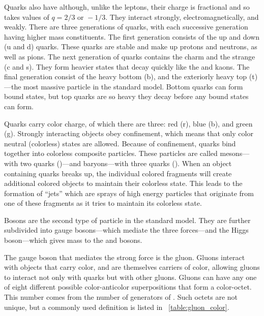 Quarks also have \spinhalf although, unlike the leptons, their charge is
fractional and so takes values of $q = 2/3 \text{ or } -1/3$. They interact
strongly, electromagnetically, and weakly. There are three generations of
quarks, with each successive generation having higher mass constituents. The
first generation consists of the up and down (u and d) quarks. These quarks are
stable and make up protons and neutrons, as well as pions. The next generation
of quarks contains the charm and the strange (c and s). They form heavier
states that decay quickly like the \jpsi and kaons. The final generation
consist of the heavy bottom (b), and the exteriorly heavy top (t)---the most
massive particle in the standard model. Bottom quarks can form bound states,
but top quarks are so heavy they decay before any bound states can form.

Quarks carry color charge, of which there are three: red (r),
blue (b), and green (g). Strongly interacting objects obey confinement, which
means that only color neutral (colorless) states are allowed. Because of
confinement, quarks bind together into colorless composite particles. These
particles are called mesons---with two quarks (\qqbar)---and baryons---with
three quarks (\baryon). When an object containing quarks breaks up, the
individual colored fragments will create additional colored objects to maintain
their colorless state. This leads to the formation of ``jets'' which are sprays
of high energy particles that originate from one of these fragments as it tries
to maintain its colorless state.

Bosons are the second type of particle in the standard model. They are further
subdivided into gauge bosons---which mediate the three forces---and the Higgs
boson---which gives mass to the \W and \Z bosons.

The gauge boson that mediates the strong force is the gluon. Gluons interact
with objects that carry color, and are themselves carriers of color, allowing
gluons to interact not only with quarks but with other gluons. Gluons can have
any one of eight different possible color-anticolor superpositions that form a
color-octet. This number comes from the number of generators of \SUthree. Such
octets are not unique, but a commonly used definition is listed in
\TAB~\ref{table:gluon_color}.

